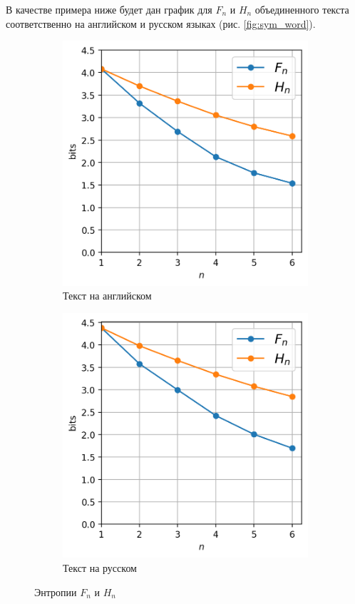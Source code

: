 \documentclass[a4paper,12pt]{article}
\begin{document}
	
	В качестве примера ниже будет дан график для $F_n$ и $ H_n $ объединенного текста соответственно на английском и русском языках (рис. \ref{fig:sym_word}).
	
	\begin{figure}[h!]
		\centering
		\begin{subfigure}{0.3\linewidth}
			\includegraphics[width=\linewidth]{figs/F_H_en}
			\caption{Текст на английском}
			\label{fig:F_H_en}
		\end{subfigure}
		\begin{subfigure}{0.3\linewidth}
			\includegraphics[width=\linewidth]{figs/F_H_ru}
			\caption{Текст на русском}
			\label{fig:F_H_ru}
		\end{subfigure}
		\caption{Энтропии $F_n$ и $H_n$}
		\label{fig:F_H}
	\end{figure}
\end{document}
